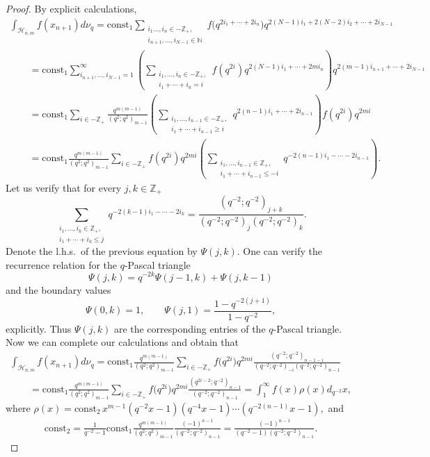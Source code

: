 \documentclass[pdftex]{sigma}
\begin{document}
\begin{proof} By explicit calculations,
\begin{gather*}
\int_{\mathscr{H}_{n,m}} f(x_{n+1}) d\nu_q= \mathrm{const_1}
\sum_{\substack{i_1\ldots,i_n \in -\mathbb{Z}_+,\\
i_{n+1},\ldots,i_{N-1} \in \mathbb{N}}} f\big(q^{2i_1+\cdots+2i_n}\big)
q^{2(N-1)i_1+2(N-2)i_2+\cdots+2i_{N-1}}
\\
\qquad{} = \mathrm{const_1}    \sum \limits_{i_{n+1},\ldots,i_{N-1}=1}^\infty \left(\sum_{\substack{i_1, \ldots, i_n
\in -\mathbb Z_+, \\ i_1+\cdots+i_n=i}} f(q^{2i})
q^{2(N-1)i_1+\cdots+2mi_n}\right) q^{2(m-1)i_{n+1}+\cdots+2i_{N-1}}
\\
\qquad{}= \mathrm{const_1} \sum_{i \in -\mathbb Z_+} \frac{q^{m(m-1)}}{(q^2;q^2)_{m-1}} \left(\sum_{\substack{i_1, \ldots, i_{n-1}
\in -\mathbb Z_+, \\ i_1+\cdots+i_{n-1} \geq i}}
q^{2(n-1)i_1+\cdots+2i_{n-1}}\right)f(q^{2i})q^{2mi}
\\
\qquad{}= \mathrm{const_1} \frac{q^{m(m-1)}}{(q^2;q^2)_{m-1}} \sum_{i \in -\mathbb Z_+} f(q^{2i})q^{2mi}  \left(
\sum_{\substack{i_1, \ldots, i_{n-1} \in \mathbb Z_+, \\ i_1+\cdots+i_{n-1} \leq -i}}
q^{-2(n-1)i_1-\cdots-2i_{n-1}}\right).
\end{gather*}
Let us verify that for every $j,k \in \mathbb Z_+$
\[
\sum_{\substack{i_1, \ldots, i_k \in \mathbb Z_+, \\ i_1+\cdots+i_k
\leq j}}
q^{-2(k-1)i_1-\cdots-2i_k}=\frac{(q^{-2};q^{-2})_{j+k}}{(q^{-2};q^{-2})_j(q^{-2};q^{-2})_k}.
\]
Denote the l.h.s.\ of the previous equation by $\Psi(j,k)$. One can verify the recurrence relation for the
$q$-Pascal triangle
\[
\Psi(j,k)=q^{-2k}\Psi(j-1,k)+\Psi(j,k-1)
\]
and the boundary values
\[
\Psi(0,k)=1, \qquad \Psi(j,1)=\frac{1-q^{-2(j+1)}}{1-q^{-2}},
\]
explicitly. Thus $\Psi(j,k)$ are the corresponding entries of the $q$-Pascal triangle. Now we can complete our
calculations and obtain that
\begin{gather*}
\int_{\mathscr{H}_{n,m}} f(x_{n+1}) d\nu_q= \mathrm{const_1}
\frac{q^{m(m-1)}}{(q^2;q^2)_{m-1}} \sum_{i \in -\mathbb Z_+} f\big(q^{2i}\big)
q^{2mi}
\frac{(q^{-2};q^{-2})_{n-1-i}}{(q^{-2};q^{-2})_{-i}(q^{-2};q^{-2})_{n-1}}
\\
\qquad {} = \mathrm{const_1}   \frac{q^{m(m-1)}}{(q^2;q^2)_{m-1}} \sum_{i
\in -\mathbb Z_+} f\big(q^{2i}\big) q^{2mi}
\frac{(q^{2i-2};q^{-2})_{n-1}}{(q^{-2};q^{-2})_{n-1}}=\int_1^\infty
f(x)\rho(x) d_{q^{-2}}x,
\end{gather*}
where $\rho(x)=\mathrm{const_2} \,  x^{m-1}(q^{-2}x-1)(q^{-4}x-1)\cdots (q^{-2(n-1)}x-1),$ and
\begin{gather*}
\mathrm{const_2}=\frac{1}{q^{-2}-1} \mathrm{const_1}   \frac{q^{m(m-1)}}{(q^2;q^2)_{m-1}}
\frac{(-1)^{n-1}}{(q^{-2};q^{-2})_{n-1}} =
\frac{(-1)^{n-1}}{(q^{-2}-1)(q^{-2};q^{-2})_{n-1}}.  \tag*{\qed}
\end{gather*}
\renewcommand{\qed}{}
\end{proof}
\end{document}
